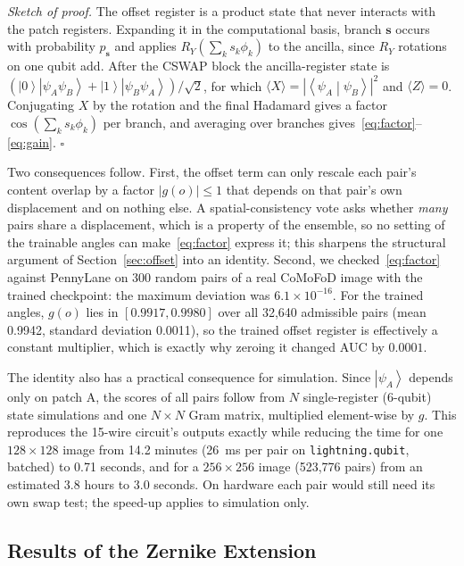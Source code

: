 \documentclass[conference]{IEEEtran}
\newcommand{\ket}[1]{\left|#1\right\rangle}
\newcommand{\braket}[2]{\left\langle#1\middle|#2\right\rangle}
\begin{document}
\emph{Sketch of proof.} The offset register is a product state that never interacts with the patch registers. Expanding it in the computational basis, branch $\mathbf{s}$ occurs with probability $p_{\mathbf{s}}$ and applies $R_Y(\sum_k s_k\phi_k)$ to the ancilla, since $R_Y$ rotations on one qubit add. After the CSWAP block the ancilla-register state is $(\ket{0}\ket{\psi_A\psi_B} + \ket{1}\ket{\psi_B\psi_A})/\sqrt{2}$, for which $\langle X\rangle = |\braket{\psi_A}{\psi_B}|^2$ and $\langle Z\rangle = 0$. Conjugating $X$ by the rotation and the final Hadamard gives a factor $\cos(\sum_k s_k\phi_k)$ per branch, and averaging over branches gives~\eqref{eq:factor}--\eqref{eq:gain}. $\square$

Two consequences follow. First, the offset term can only rescale each pair's content overlap by a factor $|g(o)|\le1$ that depends on that pair's own displacement and on nothing else. A spatial-consistency vote asks whether \emph{many} pairs share a displacement, which is a property of the ensemble, so no setting of the trainable angles can make~\eqref{eq:factor} express it; this sharpens the structural argument of Section~\ref{sec:offset} into an identity. Second, we checked~\eqref{eq:factor} against PennyLane on 300 random pairs of a real CoMoFoD image with the trained checkpoint: the maximum deviation was $6.1\times10^{-16}$. For the trained angles, $g(o)$ lies in $[0.9917, 0.9980]$ over all 32,640 admissible pairs (mean 0.9942, standard deviation 0.0011), so the trained offset register is effectively a constant multiplier, which is exactly why zeroing it changed AUC by $0.0001$.

The identity also has a practical consequence for simulation. Since $\ket{\psi_A}$ depends only on patch A, the scores of all pairs follow from $N$ single-register (6-qubit) state simulations and one $N\times N$ Gram matrix, multiplied element-wise by $g$. This reproduces the 15-wire circuit's outputs exactly while reducing the time for one $128\times128$ image from 14.2 minutes (26~ms per pair on \texttt{lightning.qubit}, batched) to 0.71 seconds, and for a $256\times256$ image (523,776 pairs) from an estimated 3.8 hours to 3.0 seconds. On hardware each pair would still need its own swap test; the speed-up applies to simulation only.

\subsection{Results of the Zernike Extension}\label{sec:zres}
\end{document}
